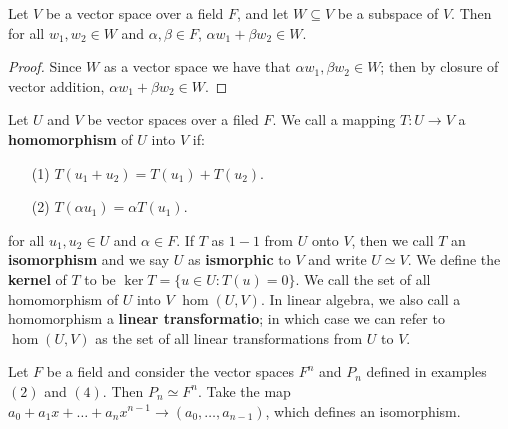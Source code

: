\begin{lemma}\label{2.1.2}
    Let $V$ be a vector space over a field  $F$, and let  $W \subseteq V$ be a
    subspace of  $V$. Then for all  $ w_1,w_2 \in W$ and $\alpha,\beta \in F$,
    $\alpha w_1+\beta w_2 \in W$.
\end{lemma}
\begin{proof}
    Since $W$ as a vector space  we have that $ \alpha w_1,\beta w_2 \in W$;
    then by closure of vector addition, $\alpha w_1+\beta w_2 \in W$.
\end{proof}

\begin{definition}
    Let $U$ and $V$ be vector spaces over a filed $F$. We call a mapping $T:U
    \rightarrow V$ a \textbf{homomorphism} of $U$ into $V$ if: 
        \begin{enumerate}
            \item[(1)] $T(u_1+u_2)=T(u_1)+T(u_2)$.

            \item[(2)] $T(\alpha u_1)=\alpha T(u_1)$.
        \end{enumerate}
    for all $ u_1,u_2 \in U$ and $\alpha \in F$. If $T$ as $1-1$ from $U$
    onto $V$, then we call $T$ an \textbf{isomorphism} and we say $U$ as
    \textbf{ismorphic} to $V$ and write  $U \simeq V$. We define the
    \textbf{kernel} of $T$ to be $\ker{T}=\{u \in U: T(u)=0\}$. We call the set
    of all homomorphism of $U$ into $V$  $\hom(U,V)$. In linear algebra, we also call 
    a homomorphism a \textbf{linear transformatio}; in which case we can refer to 
    $\hom(U,V)$ as the set of all linear transformations from $U$ to $V$.

\end{definition}

\begin{example}
    Let $F$ be a field and consider the vector spaces  $F^n$ and  $P_n$ defined
    in examples $(2)$ and $(4)$. Then $P_n \simeq F^n$. Take the map  $
    a_0+a_1x+\dots+a_nx^{n-1} \rightarrow (a_0, \dots, a_{n-1})$, which defines
    an isomorphism.
\end{example}

